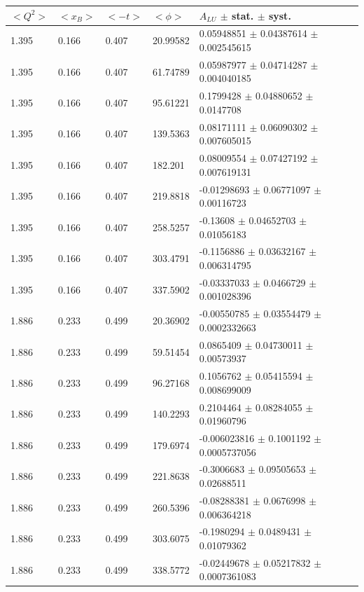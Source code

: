 \begin{table}[!h]
   \begin{center}
      \begin{tabular}{||l|l|l|l|l||}
         \hline
 $<Q^{2}>$ & $<x_{B}>$ & $<-t>$ & $<\phi>$ & $A_{LU}$ $\pm$ stat. $\pm$ syst.\\
         \hline  


 1.395 & 0.166 & 0.407  & 20.99582 & 0.05948851  $\pm$ 0.04387614  $\pm$ 
0.002545615    \\
 1.395 & 0.166 & 0.407  & 61.74789 & 0.05987977  $\pm$ 0.04714287  $\pm$ 
0.004040185    \\
 1.395 & 0.166 & 0.407  & 95.61221 & 0.1799428   $\pm$ 0.04880652  $\pm$ 0.0147708      \\
 1.395 & 0.166 & 0.407  & 139.5363 & 0.08171111  $\pm$ 0.06090302  $\pm$ 0.007605015    \\
 1.395 & 0.166 & 0.407  & 182.201  &0.08009554   $\pm$ 0.07427192  $\pm$ 0.007619131    \\
 1.395 & 0.166 & 0.407  & 219.8818 & -0.01298693 $\pm$ 0.06771097  $\pm$ 0.00116723     \\
 1.395 & 0.166 & 0.407  & 258.5257 & -0.13608    $\pm$ 0.04652703  $\pm$ 0.01056183     \\
 1.395 & 0.166 & 0.407  & 303.4791 & -0.1156886  $\pm$ 0.03632167  $\pm$ 0.006314795    \\
 1.395 & 0.166 & 0.407  & 337.5902 & -0.03337033 $\pm$ 0.0466729   $\pm$ 0.001028396    \\
   
         \hline
  1.886 & 0.233 & 0.499 & 20.36902 & -0.00550785  $\pm$ 0.03554479  $\pm$  
0.0002332663   \\
  1.886 & 0.233 & 0.499 & 59.51454 & 0.0865409    $\pm$ 0.04730011  $\pm$  0.00573937     \\
  1.886 & 0.233 & 0.499 & 96.27168 & 0.1056762    $\pm$ 0.05415594  $\pm$  0.008699009    \\
  1.886 & 0.233 & 0.499 & 140.2293 & 0.2104464    $\pm$ 0.08284055  $\pm$  0.01960796     \\
  1.886 & 0.233 & 0.499 & 179.6974 & -0.006023816 $\pm$ 0.1001192   $\pm$  0.0005737056   \\
  1.886 & 0.233 & 0.499 & 221.8638 & -0.3006683   $\pm$ 0.09505653  $\pm$  0.02688511     \\
  1.886 & 0.233 & 0.499 & 260.5396 & -0.08288381  $\pm$ 0.0676998   $\pm$  0.006364218    \\
  1.886 & 0.233 & 0.499 & 303.6075 & -0.1980294   $\pm$ 0.0489431   $\pm$  0.01079362     \\
  1.886 & 0.233 & 0.499 & 338.5772 & -0.02449678  $\pm$ 0.05217832  $\pm$  0.0007361083   \\
    

\end{tabular}
\end{center}
\end{table}
